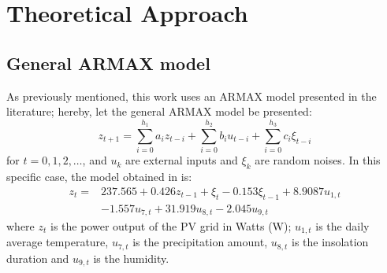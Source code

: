 \section{Theoretical Approach}\label{sec:theo}
\subsection{General ARMAX model}

As previously mentioned, this work uses an ARMAX model presented in the literature; hereby, let the general ARMAX model be presented:
\begin{equation}
    z_{t+1}=\sum_{i=0}^{h_1}a_iz_{t-i}+\sum_{i=0}^{h_2}b_iu_{t-i}+\sum_{i=0}^{h_3}c_i\xi_{t-i}
\end{equation}
for $t=0,1,2,\ldots$, and $u_k$ are external inputs and $\xi_k$ are random noises. In this specific case, the model obtained in \cite{li2014armax} is:
\begin{equation}
\begin{aligned} z_{t}=& 237.565+0.426z_{t-1}+\xi_{t}-0.153 \xi_{t-1}+8.9087u_{1, t} \\ &-1.557 u_{7, t}+31.919 u_{8, t}-2.045u_{9, t}
\end{aligned}
\end{equation}
where $z_t$ is the power output of the PV grid in Watts (W); $u_{1,t}$ is the daily average temperature, $u_{7,t}$ is the precipitation amount, $u_{8,t}$ is the insolation duration and $u_{9,t}$ is the humidity.
